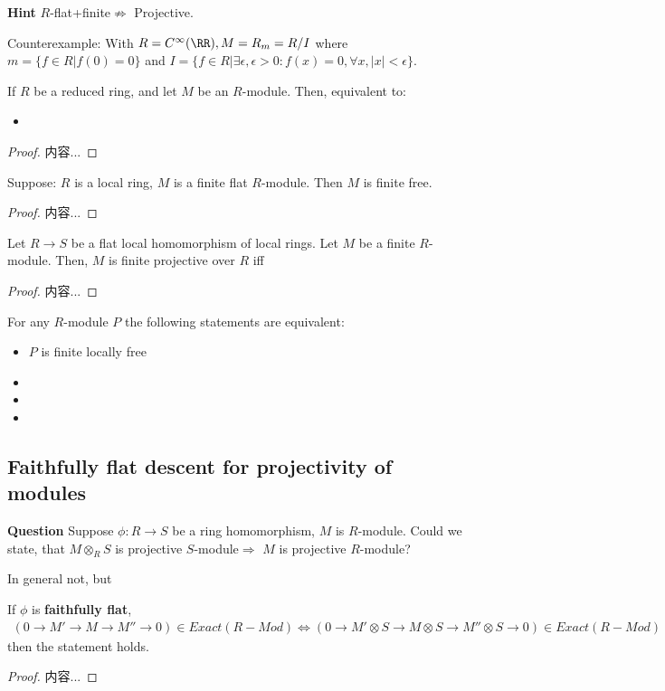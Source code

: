 \documentclass[Total.tex]{subfiles}
\begin{document}
			\textbf{Hint} $R$-flat+finite$\not\Rightarrow$ Projective.
			
			Counterexample: With $R=C^\infty(\RR),M=R_m=R/I$ where $m=\{f\in R|f(0)=0\}$ and $I=\{f\in R|\exists\epsilon,\epsilon>0:f(x)=0,\forall x,|x|<\epsilon\}$. 
			
			\begin{proposition}
				If $R$ be a reduced ring, and let $M$ be an $R$-module. Then, equivalent to:
				\begin{itemize}
					\item 
				\end{itemize}
			\end{proposition}
			\begin{proof}
				内容...
			\end{proof}
			\begin{proposition}
				Suppose: $R$ is a local ring, $M$ is a finite flat $R$-module. Then $M$ is finite free.
			\end{proposition}
			\begin{proof}
				内容...
			\end{proof}
			\begin{proposition}
				Let $R\rightarrow S$ be a flat local homomorphism of local rings. Let $M$ be a finite $R$-module. Then, $M$ is finite projective over $R$ iff
			\end{proposition}
			\begin{proof}
				内容...
			\end{proof}
				\begin{proposition}
					For any $R$-module $P$ the following statements are equivalent:
					\begin{itemize}
						\item $P$ is finite locally free
						\item 
						\item 
						\item 
					\end{itemize}
				\end{proposition}
			\subsection{Faithfully flat descent for projectivity of modules}
				\textbf{Question} Suppose $\phi:R\rightarrow S$ be a ring homomorphism, $M$ is $R$-module. Could we state, that $M\otimes_R S$ is projective $S$-module$\Rightarrow$ $M$ is projective $R$-module?
				
				In general not, but
				\begin{proposition}
					If $\phi$ is \textbf{faithfully flat},
					\begin{gather*}
						(0\rightarrow M'\rightarrow M\rightarrow M''\rightarrow 0)\in Exact(R-Mod)\Leftrightarrow  (0\rightarrow M'\otimes S\rightarrow M
						\otimes S\rightarrow M''\otimes S\rightarrow 0)\in Exact(R-Mod)
					\end{gather*} then the statement holds.
				\end{proposition}
				\begin{proof}
					内容...
				\end{proof}
\end{document}
